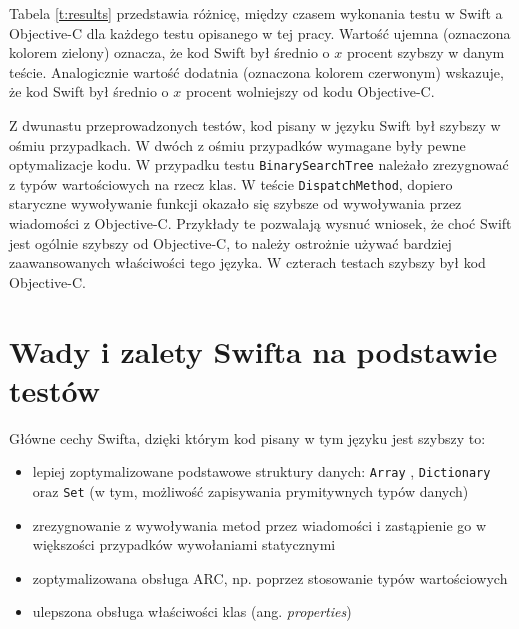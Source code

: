 \documentclass[mgr, shortabstract]{iithesis}
\newcommand{\ang}[1]{ang. \textit{#1}}
\newcommand{\swiftinline}[1]{
    \texttt{#1}
}
\begin{document}

Tabela \ref{t:results} przedstawia różnicę, między czasem wykonania testu w Swift a Objective-C dla każdego testu opisanego w tej pracy. Wartość ujemna (oznaczona kolorem zielony) oznacza, że kod Swift był średnio o $x$ procent szybszy w danym teście. Analogicznie wartość dodatnia (oznaczona kolorem czerwonym) wskazuje, że kod Swift był średnio o $x$ procent wolniejszy od kodu Objective-C.

Z dwunastu przeprowadzonych testów, kod pisany w języku Swift był szybszy w ośmiu przypadkach. W dwóch z ośmiu przypadków wymagane były pewne optymalizacje kodu. W przypadku testu \texttt{BinarySearchTree} należało zrezygnować z typów wartościowych na rzecz klas. W teście \texttt{DispatchMethod}, dopiero staryczne wywoływanie funkcji okazało się szybsze od wywoływania przez wiadomości z Objective-C. Przykłady te pozwalają wysnuć wniosek, że choć Swift jest ogólnie szybszy od Objective-C, to należy ostrożnie używać bardziej zaawansowanych właściwości tego języka. W czterach testach szybszy był kod Objective-C.

\section{Wady i zalety Swifta na podstawie testów}

Główne cechy Swifta, dzięki którym kod pisany w tym języku jest szybszy to:
\begin{itemize}
    \item lepiej zoptymalizowane podstawowe struktury danych: \swiftinline{Array}, \swiftinline{Dictionary} oraz \swiftinline{Set} (w tym, możliwość zapisywania prymitywnych typów danych)
    \item zrezygnowanie z wywoływania metod przez wiadomości i zastąpienie go w większości przypadków wywołaniami statycznymi
    \item zoptymalizowana obsługa ARC, np. poprzez stosowanie typów wartościowych   
    \item ulepszona obsługa właściwości klas (\ang{properties})    
\end{itemize}
\end{document}
